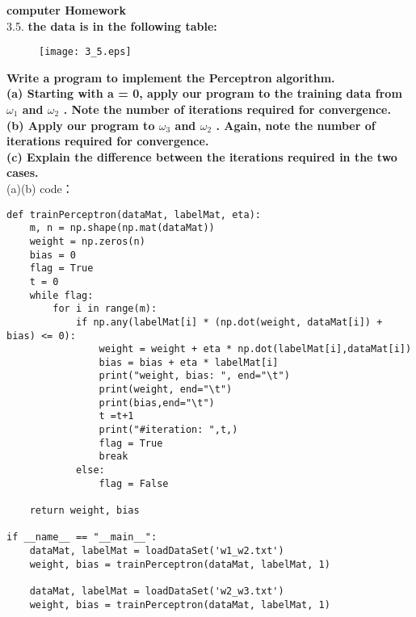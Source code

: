 \newpage
\noindent\textbf{computer Homework}\\
3.5. \textbf{the data is in the following table:}
\begin{figure}[h]
  \texttt{[image: 3\_5.eps]}
\end{figure}
\textbf{Write a program to implement the Perceptron algorithm.\\
(a) Starting with a = 0, apply our program to the training data from $\omega_1$ and $\omega_2$ . Note the number of
iterations required for convergence.\\
(b) Apply our program to $\omega_3$ and $\omega_2$ . Again, note the number of iterations required for convergence.\\
(c) Explain the difference between the iterations required in the two cases.
}
\\


\noindent (a)(b) code：
\begin{lstlisting}
def trainPerceptron(dataMat, labelMat, eta):
    m, n = np.shape(np.mat(dataMat))
    weight = np.zeros(n)
    bias = 0
    flag = True
    t = 0
    while flag:
        for i in range(m):
            if np.any(labelMat[i] * (np.dot(weight, dataMat[i]) + bias) <= 0):
                weight = weight + eta * np.dot(labelMat[i],dataMat[i])
                bias = bias + eta * labelMat[i]
                print("weight, bias: ", end="\t")
                print(weight, end="\t")
                print(bias,end="\t")
                t =t+1
                print("#iteration: ",t,)
                flag = True
                break
            else:
                flag = False

    return weight, bias

if __name__ == "__main__":
    dataMat, labelMat = loadDataSet('w1_w2.txt')
    weight, bias = trainPerceptron(dataMat, labelMat, 1)

    dataMat, labelMat = loadDataSet('w2_w3.txt')
    weight, bias = trainPerceptron(dataMat, labelMat, 1)
\end{lstlisting}

